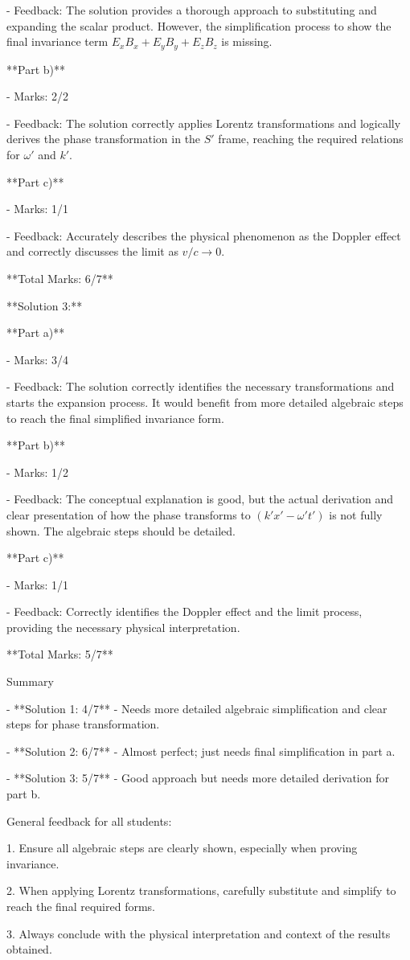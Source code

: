 \documentclass[a4paper,11pt]{article}
\begin{document}
- Feedback: The solution provides a thorough approach to substituting and expanding the scalar product. However, the simplification process to show the final invariance term \(E_x B_x + E_y B_y + E_z B_z\) is missing.

**Part b)**

- Marks: 2/2

- Feedback: The solution correctly applies Lorentz transformations and logically derives the phase transformation in the \(S'\) frame, reaching the required relations for \(\omega'\) and \(k'\).

**Part c)**

- Marks: 1/1

- Feedback: Accurately describes the physical phenomenon as the Doppler effect and correctly discusses the limit as \(v/c \rightarrow 0\).

**Total Marks: 6/7**

**Solution 3:**

**Part a)**

- Marks: 3/4

- Feedback: The solution correctly identifies the necessary transformations and starts the expansion process. It would benefit from more detailed algebraic steps to reach the final simplified invariance form.

**Part b)**

- Marks: 1/2

- Feedback: The conceptual explanation is good, but the actual derivation and clear presentation of how the phase transforms to \((k'x' - \omega' t')\) is not fully shown. The algebraic steps should be detailed.

**Part c)**

- Marks: 1/1

- Feedback: Correctly identifies the Doppler effect and the limit process, providing the necessary physical interpretation.

**Total Marks: 5/7**

Summary

- **Solution 1: 4/7** - Needs more detailed algebraic simplification and clear steps for phase transformation.

- **Solution 2: 6/7** - Almost perfect; just needs final simplification in part a.

- **Solution 3: 5/7** - Good approach but needs more detailed derivation for part b.

General feedback for all students:

1. Ensure all algebraic steps are clearly shown, especially when proving invariance.

2. When applying Lorentz transformations, carefully substitute and simplify to reach the final required forms.

3. Always conclude with the physical interpretation and context of the results obtained.
\end{document}
